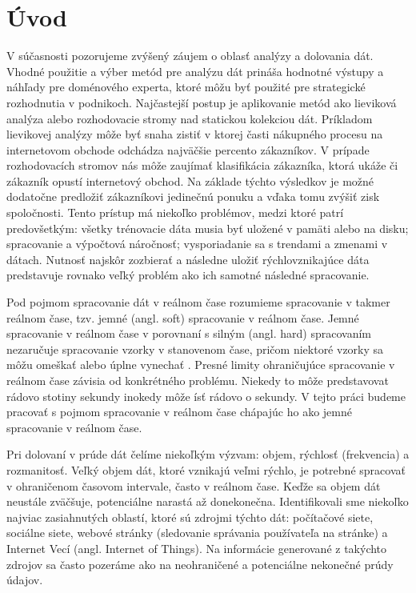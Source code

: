 
\chapter{Úvod}
V súčasnosti pozorujeme zvýšený záujem o oblasť analýzy a dolovania dát. Vhodné použitie a výber metód pre analýzu dát prináša hodnotné výstupy a náhľady pre doménového experta, ktoré môžu byť použité pre strategické rozhodnutia v podnikoch. Najčastejší postup je aplikovanie metód ako lieviková analýza alebo rozhodovacie stromy nad statickou kolekciou dát. Príkladom lievikovej analýzy môže byť snaha zistiť v ktorej časti nákupného procesu na internetovom obchode odchádza najväčšie percento zákazníkov. V prípade rozhodovacích stromov nás môže zaujímať klasifikácia zákazníka, ktorá ukáže či zákazník opustí internetový obchod. Na základe týchto výsledkov je možné dodatočne predložiť zákazníkovi jedinečnú ponuku a vďaka tomu zvýšiť zisk spoločnosti. Tento prístup má niekoľko problémov, medzi ktoré patrí predovšetkým: všetky trénovacie dáta musia byť uložené v pamäti alebo na disku; spracovanie a výpočtová náročnosť; vysporiadanie sa s trendami a zmenami v dátach. Nutnosť najskôr zozbierať a následne uložiť rýchlovznikajúce dáta predstavuje rovnako veľký problém ako ich samotné následné spracovanie.
\par
Pod pojmom spracovanie dát v reálnom čase rozumieme spracovanie v takmer reálnom čase, tzv. jemné (angl. soft) spracovanie v reálnom čase. Jemné spracovanie v reálnom čase v porovnaní s silným (angl. hard) spracovaním nezaručuje spracovanie vzorky v stanovenom čase, pričom niektoré vzorky sa môžu omeškať alebo úplne vynechať \citep{stankovic1988real}. Presné limity ohraničujúce spracovanie v reálnom čase závisia od konkrétného problému. Niekedy to môže predstavovat rádovo stotiny sekundy inokedy môže ísť rádovo o sekundy. V tejto práci budeme pracovať s pojmom spracovanie v reálnom čase chápajúc ho ako jemné spracovanie v reálnom čase.
\par
Pri dolovaní v prúde dát čelíme niekoľkým výzvam: objem,  rýchlosť (frekvencia) a rozmanitosť. Veľký objem dát, ktoré vznikajú veľmi rýchlo, je potrebné spracovať v ohraničenom časovom intervale, často v reálnom čase. Keďže sa objem dát neustále zväčšuje, potenciálne narastá až donekonečna. Identifikovali sme niekoľko najviac zasiahnutých oblastí, ktoré sú zdrojmi týchto dát: počítačové siete, sociálne siete, webové stránky (sledovanie správania používateľa na stránke) a Internet Vecí (angl. Internet of Things). Na informácie generované z takýchto zdrojov sa často pozeráme ako na neohraničené a potenciálne nekonečné prúdy údajov.

